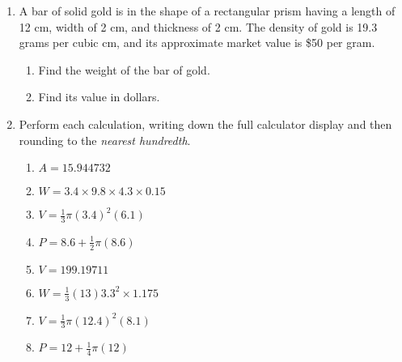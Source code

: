 \documentclass[12pt, twoside]{article}
\begin{document}
\begin{enumerate}
\item A bar of solid gold is in the shape of a rectangular prism having a length of 12 cm, width of 2 cm, and thickness of 2 cm. The density of gold is 19.3 grams per cubic cm, and its approximate market value is \$50 per gram.
  \begin{enumerate}
    \item Find the weight of the bar of gold.  \vspace{3cm}
    \item Find its value in dollars.
  \end{enumerate}

\newpage
\item Perform each calculation, writing down the full calculator display and then rounding to the \emph{nearest hundredth}.
    \begin{multicols}{2}
    \begin{enumerate}[itemsep=4cm]
      \item $A=15.944732$
      \item $W=3.4 \times 9.8 \times 4.3 \times 0.15$
            
      \item $V=\frac{1}{3} \pi (3.4)^2(6.1)$
      \item $P=8.6 + \frac{1}{2} \pi (8.6)$  
      \item $V=199.19711$
      \item $W=\frac{1}{3} (13)  3.3^2 \times 1.175$
      \item $V=\frac{1}{3} \pi (12.4)^2(8.1)$
      \item $P=12 + \frac{1}{4} \pi (12)$ 
    \end{enumerate}
    \end{multicols}\vspace{2cm}


\end{enumerate}
\end{document}
